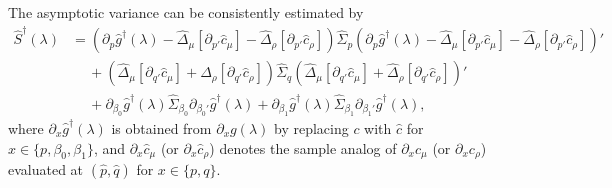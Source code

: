 \documentclass[11pt]{article}
\theoremstyle{definition}
\newcommand{\0}{\ensuremath{\mathbf{0}}}
\begin{document}
\begin{bibunit}
The asymptotic variance can be consistently estimated by
\begin{align*}
    \hat{S}^\dagger(\lambda) 
    & = \left(\partial_{p}\hat{g}^\dagger(\lambda) - \hat{\Delta}_\mu [\partial_{p'} \hat{c}_\mu] - \hat{\Delta}_\rho [\partial_{p'} \hat{c}_\rho]\right)\hat{\Sigma}_p\left(\partial_{p}\hat{g}^\dagger(\lambda) - \hat{\Delta}_\mu [\partial_{p'} \hat{c}_\mu] - \hat{\Delta}_\rho [\partial_{p'} \hat{c}_\rho]\right)' \\
    & \quad ~+ \left(\hat{\Delta}_\mu [\partial_{q'}\hat{c}_\mu] + \hat{\Delta}_\rho [\partial_{q'}\hat{c}_\rho]\right)\hat{\Sigma}_q \left(\hat{\Delta}_\mu [\partial_{q'}\hat{c}_\mu] + \hat{\Delta}_\rho [\partial_{q'}\hat{c}_\rho]\right)' \\
    & \quad ~+ \partial_{\beta_0}\hat{g}^\dagger(\lambda) \hat{\Sigma}_{\beta_0}\partial_{\beta_0'}\hat{g}^\dagger(\lambda) + \partial_{\beta_1}\hat{g}^\dagger(\lambda) \hat{\Sigma}_{\beta_1}\partial_{\beta_1'}\hat{g}^\dagger(\lambda),
\end{align*}
where $\partial_x \hat{g}^\dagger(\lambda)$ is obtained from $\partial_x g(\lambda)$ by replacing $c$ with $\hat{c}$ for $x \in \{p,\beta_0,\beta_1\}$, and $\partial_x \hat{c}_\mu$ (or $\partial_x \hat{c}_\rho$) denotes the sample analog of $\partial_x c_\mu$ (or $\partial_x c_\rho$) evaluated at $(\hat{p}, \hat{q})$ for $x \in \{p,q\}$.
 

\end{bibunit}
\end{document}
